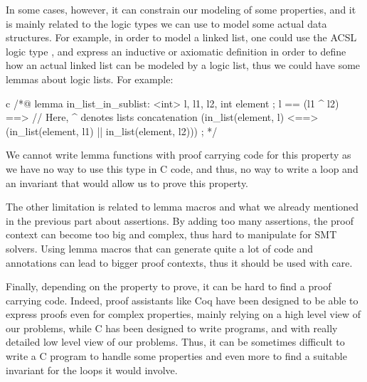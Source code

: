 In some cases, however, it can constrain our modeling of some properties, and
it is mainly related to the logic types we can use to model some actual data
structures. For example, in order to model a linked list, one could use the
ACSL logic type , and express an
inductive or axiomatic definition in order to define how an actual linked list
can be modeled by a logic list, thus we could have some lemmas about logic
lists. For example:

\begin{CodeBlock}{c}
/*@
  lemma in_list_in_sublist:
    \forall \list<int> l, l1, l2, int element ;
      l == (l1 ^ l2) ==>      // Here, ^ denotes lists concatenation
      (in_list(element, l) <==> (in_list(element, l1) || in_list(element, l2))) ;
*/
\end{CodeBlock}

We cannot write lemma functions with proof carrying code for this property as
we have no way to use this type in C code, and thus, no way to write a loop and
an invariant that would allow us to prove this property.


The other limitation is related to lemma macros and what we already mentioned
in the previous part about assertions. By adding too many assertions, the proof
context can become too big and complex, thus hard to manipulate for SMT
solvers. Using lemma macros that can generate quite a lot of code and annotations
can lead to bigger proof contexts, thus it should be used with care.


Finally, depending on the property to prove, it can be hard to find a proof
carrying code. Indeed, proof assistants like Coq have been designed to be able
to express proofs even for complex properties, mainly relying on a high level
view of our problems, while C has been designed to write programs, and with
really detailed low level view of our problems. Thus, it can be sometimes
difficult to write a C program to handle some properties and even more to find
a suitable invariant for the loops it would involve.





